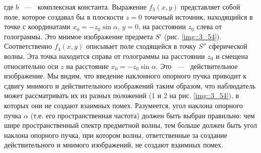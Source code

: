 где $b$ ~---~ комплексная константа. Выражение $f_3(x,y)$ представляет собой
поле, которое создавал бы в плоскости $z = 0$ точечный источник, находящийся в точке с координатами
$x_0 = -z_0 \sin{\alpha}$, $y = 0$, на расстоянии $z_0$ слева от голограммы.
Это мнимое изображение предмета $S'$ (рис. \ref{img::3_54}).
Соответственно $f_4(x,y)$ описывает поле сходящейся в точку $S''$
сферической волны. Эта точка находится справа от голограммы на расстоянии
$z_0$ и смещена относительно оси $z$ на расстояние $x_0 = -z_0 \sin{\alpha}$.
Это ~---~ действительное изображение. Мы видим, что введение наклонного
опорного пучка приводит к сдвигу мнимого и действительного изображений таким образом, что наблюдатель может рассматривать их из
разных положений (1 и 2 на рис. \ref{img::3_54}), в которых они не создают взаимных помех.
Разумеется, угол наклона опорного пучка $\alpha$ (т.е. его пространственная частота) должен быть выбран правильно: чем шире
пространственный спектр предметной волны, тем больше должен быть угол наклона опорного пучка, 
при котором волны, ответственные за создание действительного и мнимого изображений, не создают взаимных помех.